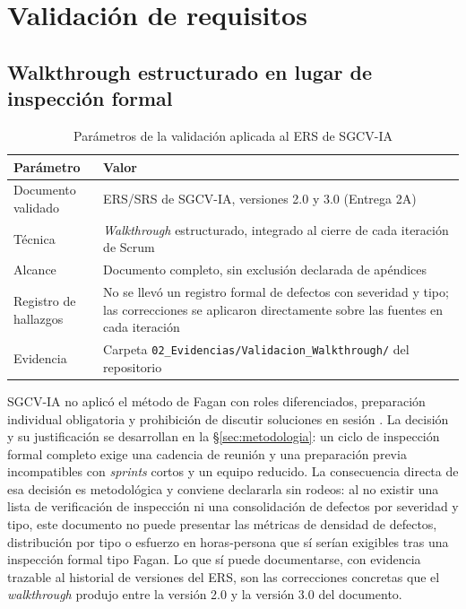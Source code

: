 \section{Validación de requisitos}
\label{sec:validacion}
 
\subsection{Walkthrough estructurado en lugar de inspección formal}
 
\begin{table}[H]
\centering\footnotesize
\caption{Parámetros de la validación aplicada al ERS de SGCV-IA}
\label{tab:validacion}
\begin{tabular}{|L{6.4cm}|L{8.6cm}|}
\hline
{}\textbf{Parámetro} & \textbf{Valor}\\ \hline
Documento validado & ERS/SRS de SGCV-IA, versiones 2.0 y 3.0 (Entrega 2A)\\ \hline
Técnica & \emph{Walkthrough} estructurado, integrado al cierre de cada iteración de Scrum\\ \hline
Alcance & Documento completo, sin exclusión declarada de apéndices\\ \hline
Registro de hallazgos & No se llevó un registro formal de defectos con severidad y tipo; las correcciones se aplicaron directamente sobre las fuentes en cada iteración\\ \hline
Evidencia & Carpeta \texttt{02\_Evidencias/Validacion\_Walkthrough/} del repositorio\\ \hline
\end{tabular}
\end{table}
 
\noindent
SGCV-IA no aplicó el método de Fagan con roles diferenciados, preparación individual obligatoria y
prohibición de discutir soluciones en sesión \cite{fagan1976}. La decisión y su justificación se
desarrollan en la \S\ref{sec:metodologia}: un ciclo de inspección formal completo exige una cadencia
de reunión y una preparación previa incompatibles con \emph{sprints} cortos y un equipo reducido. La
consecuencia directa de esa decisión es metodológica y conviene declararla sin rodeos: al no existir
una lista de verificación de inspección ni una consolidación de defectos por severidad y tipo, este
documento no puede presentar las métricas de densidad de defectos, distribución por tipo o esfuerzo
en horas-persona que sí serían exigibles tras una inspección formal tipo Fagan. Lo que sí puede
documentarse, con evidencia trazable al historial de versiones del ERS, son las correcciones
concretas que el \emph{walkthrough} produjo entre la versión 2.0 y la versión 3.0 del documento.
 
